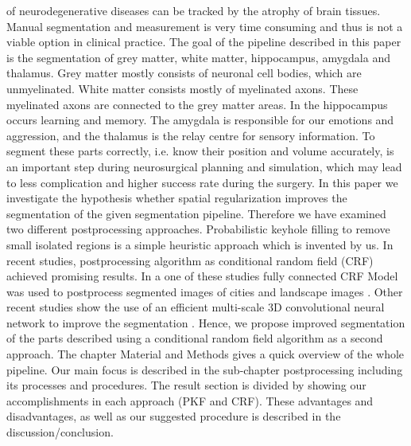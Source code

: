 \documentclass[journal]{IEEEtran}
\begin{document}
 of neurodegenerative diseases can be tracked by the atrophy of brain tissues.
Manual segmentation and measurement is very time consuming and thus is not a viable option in clinical practice. 
The goal of the pipeline described in this paper is the segmentation of grey matter, white matter, hippocampus, amygdala and thalamus. 
Grey matter mostly consists of neuronal cell bodies, which are unmyelinated. White matter consists mostly of myelinated axons. These myelinated axons are connected to the grey matter areas. In the hippocampus occurs learning and memory. The amygdala is responsible for our emotions and aggression, and the thalamus is the relay centre for sensory information. To segment these parts correctly, i.e. know their position and volume accurately, is an important step during neurosurgical planning and simulation, which may lead to less complication and higher success rate during the surgery. 
In this paper we investigate the hypothesis whether spatial regularization improves the segmentation of the given segmentation pipeline. Therefore we have examined two different postprocessing approaches. Probabilistic keyhole filling to remove small isolated regions is a simple heuristic approach which is invented by us. In recent studies, postprocessing algorithm as conditional random field (CRF) achieved promising results. In a one of these studies fully connected CRF Model was used to postprocess segmented images of cities and landscape images \cite{Liu2018}. Other recent studies show the use of an efficient multi-scale 3D convolutional neural network to improve the segmentation \cite{Kamnitsas2017}. Hence, we propose improved segmentation of the parts described using a conditional random field algorithm as a second approach.
The chapter Material and Methods gives a quick overview of the whole pipeline. Our main focus is described in the sub-chapter postprocessing including its processes and procedures. The result section is divided by showing our accomplishments in each approach (PKF and CRF). These advantages and disadvantages, as well as our suggested procedure is described in the discussion/conclusion.
\end{document}

